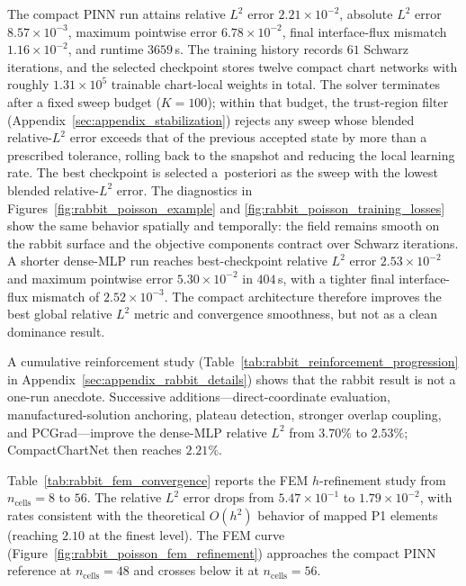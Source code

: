 \documentclass[sort&compress]{svjour3} %
\begin{document}
The compact PINN run attains relative $L^2$ error $2.21\times 10^{-2}$, absolute $L^2$ error $8.57\times 10^{-3}$, maximum pointwise error $6.78\times 10^{-2}$, final interface-flux mismatch $1.16\times 10^{-2}$, and runtime $3659$\,s. The training history records $61$ Schwarz iterations, and the selected checkpoint stores twelve compact chart networks with roughly $1.31\times 10^{5}$ trainable chart-local weights in total. The solver terminates after a fixed sweep budget ($K=100$); within that budget, the trust-region filter (Appendix~\ref{sec:appendix_stabilization}) rejects any sweep whose blended relative-$L^2$ error exceeds that of the previous accepted state by more than a prescribed tolerance, rolling back to the snapshot and reducing the local learning rate. The best checkpoint is selected a~posteriori as the sweep with the lowest blended relative-$L^2$ error. The diagnostics in Figures~\ref{fig:rabbit_poisson_example} and \ref{fig:rabbit_poisson_training_losses} show the same behavior spatially and temporally: the field remains smooth on the rabbit surface and the objective components contract over Schwarz iterations. A shorter dense-MLP run reaches best-checkpoint relative $L^2$ error $2.53\times 10^{-2}$ and maximum pointwise error $5.30\times 10^{-2}$ in $404$\,s, with a tighter final interface-flux mismatch of $2.52\times 10^{-3}$. The compact architecture therefore improves the best global relative $L^2$ metric and convergence smoothness, but not as a clean dominance result.

A cumulative reinforcement study (Table~\ref{tab:rabbit_reinforcement_progression} in Appendix~\ref{sec:appendix_rabbit_details}) shows that the rabbit result is not a one-run anecdote. Successive additions---direct-coordinate evaluation, manufactured-solution anchoring, plateau detection, stronger overlap coupling, and PCGrad---improve the dense-MLP relative $L^2$ from $3.70\%$ to $2.53\%$; CompactChartNet then reaches $2.21\%$.

Table~\ref{tab:rabbit_fem_convergence} reports the FEM $h$-refinement study from $n_{\mathrm{cells}}=8$ to $56$. The relative $L^2$ error drops from $5.47\times 10^{-1}$ to $1.79\times 10^{-2}$, with rates consistent with the theoretical $O(h^2)$ behavior of mapped P1 elements (reaching $2.10$ at the finest level). The FEM curve (Figure~\ref{fig:rabbit_poisson_fem_refinement}) approaches the compact PINN reference at $n_{\mathrm{cells}}=48$ and crosses below it at $n_{\mathrm{cells}}=56$.
\end{document}
